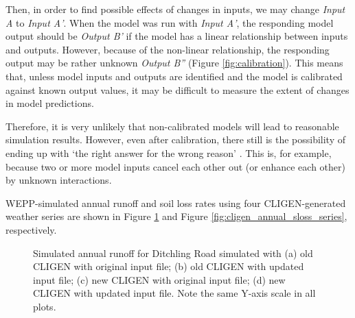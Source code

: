 Then, in order to find possible effects of changes in inputs, we may change
\emph{Input A} to \emph{Input A'}. When the model was run with \emph{Input A'},
the responding model output should be \emph{Output B'} if the model has a linear
relationship between inputs and outputs. However, because of the non-linear
relationship, the responding output may be rather unknown \emph{Output B''}
(Figure \ref{fig:calibration}). This means that, unless model inputs and outputs
are identified and the model is calibrated against known output values, it may
be difficult to measure the extent of changes in model predictions.

Therefore, it is very unlikely that non-calibrated models will lead to
reasonable simulation results. However, even after calibration, there still is
the possibility of ending up with `the right answer for the wrong reason'
\citep{favis-mortlock1994-use}. This is, for example, because two or more model
inputs cancel each other out (or enhance each other) by unknown interactions.

WEPP-simulated annual runoff and soil loss rates using four CLIGEN-generated
weather series are shown in Figure \ref{fig:cligen_annual_runoff_serise} and
Figure \ref{fig:cligen_annual_sloss_series}, respectively.

\begin{figure}[htbp]
  \centering
    \qquad
  \caption[Simulated annual runoff for Ditchling Road]{Simulated annual
runoff for Ditchling Road simulated with (a) old CLIGEN with original input
file; (b) old CLIGEN with updated input file; (c) new CLIGEN with original input
file; (d) new CLIGEN with updated input file. Note the same Y-axis scale in
all plots.}
  \label{fig:cligen_annual_runoff_serise}
\end{figure}

